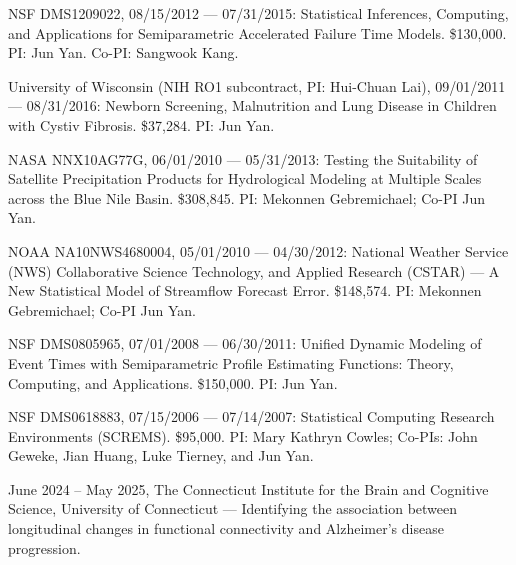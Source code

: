 \documentclass[Statistics]{vita}
\begin{document}
\begin{vita}
\begin{Grants}
\begin{External}
    \item NSF DMS1209022, 08/15/2012 --- 07/31/2015: Statistical Inferences, Computing, and Applications for Semiparametric Accelerated Failure Time Models. \$130,000. PI: Jun Yan. Co-PI: Sangwook Kang.
    \item University of Wisconsin (NIH RO1 subcontract, PI: Hui-Chuan Lai), 09/01/2011 --- 08/31/2016: Newborn Screening, Malnutrition and Lung Disease in Children with Cystiv Fibrosis. \$37,284. PI: Jun Yan.
    \item NASA NNX10AG77G, 06/01/2010 --- 05/31/2013: Testing the Suitability of Satellite Precipitation Products for Hydrological Modeling at Multiple Scales across the Blue Nile Basin. \$308,845. PI: Mekonnen Gebremichael; Co-PI Jun Yan.
    \item NOAA NA10NWS4680004, 05/01/2010 --- 04/30/2012: National Weather Service (NWS) Collaborative Science Technology, and Applied Research (CSTAR) --- A New Statistical Model of Streamflow Forecast Error. \$148,574. PI: Mekonnen Gebremichael; Co-PI Jun Yan.
    \item NSF DMS0805965, 07/01/2008 --- 06/30/2011: Unified Dynamic Modeling of Event Times with Semiparametric Profile Estimating Functions: Theory, Computing, and Applications. \$150,000. PI: Jun Yan.
    \item NSF DMS0618883, 07/15/2006 --- 07/14/2007: Statistical Computing Research Environments (SCREMS). \$95,000. PI: Mary Kathryn Cowles; Co-PIs: John Geweke, Jian Huang, Luke Tierney, and Jun Yan.
  \end{External}
  \begin{Internal}
  \item June 2024 -- May 2025, The Connecticut Institute for the Brain and Cognitive Science, University of Connecticut ---  Identifying the association between longitudinal changes in functional connectivity and Alzheimer's disease progression.

\end{Internal}
\end{Grants}
\end{vita}
\end{document}
